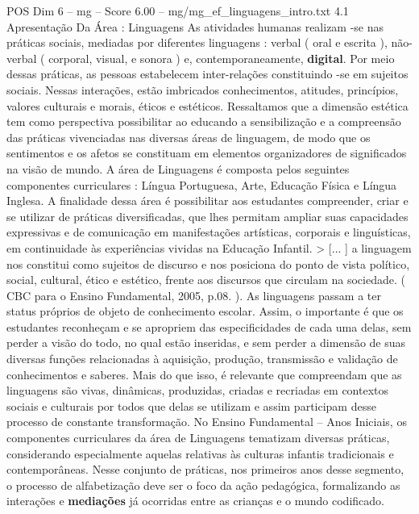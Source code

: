 \begin{textsample}{POS Dim 6 – mg – Score 6.00 – mg/mg\_ef\_linguagens\_intro.txt}  \label{ex:f6_pos_250}
4.1 Apresentação Da Área : Linguagens As atividades humanas realizam -se nas práticas sociais, mediadas por diferentes linguagens : verbal ( oral e escrita ), não-verbal ( corporal, visual, e sonora ) e, contemporaneamente, \textbf{digital}.
Por meio dessas práticas, as pessoas estabelecem inter-relações constituindo -se em sujeitos sociais.
Nessas interações, estão imbricados conhecimentos, atitudes, princípios, valores culturais e morais, éticos e estéticos.
Ressaltamos que a dimensão estética tem como perspectiva possibilitar ao educando a sensibilização e a compreensão das práticas vivenciadas nas diversas áreas de linguagem, de modo que os sentimentos e os afetos se constituam em elementos organizadores de significados na visão de mundo.
A área de Linguagens é composta pelos seguintes componentes curriculares : Língua Portuguesa, Arte, Educação Física e Língua Inglesa.
A finalidade dessa área é possibilitar aos estudantes compreender, criar e se utilizar de práticas diversificadas, que lhes permitam ampliar suas capacidades expressivas e de comunicação em manifestações artísticas, corporais e linguísticas, em continuidade às experiências vividas na Educação Infantil. > [... ] a linguagem nos constitui como sujeitos de discurso e nos posiciona do ponto de vista político, social, cultural, ético e estético, frente aos discursos que circulam na sociedade. ( CBC para o Ensino Fundamental, 2005, p.08. ).
As linguagens passam a ter status próprios de objeto de conhecimento escolar.
Assim, o importante é que os estudantes reconheçam e se apropriem das especificidades de cada uma delas, sem perder a visão do todo, no qual estão inseridas, e sem perder a dimensão de suas diversas funções relacionadas à aquisição, produção, transmissão e validação de conhecimentos e saberes.
Mais do que isso, é relevante que compreendam que as linguagens são vivas, dinâmicas, produzidas, criadas e recriadas em contextos sociais e culturais por todos que delas se utilizam e assim participam desse processo de constante transformação.
No Ensino Fundamental – Anos Iniciais, os componentes curriculares da área de Linguagens tematizam diversas práticas, considerando especialmente aquelas relativas às culturas infantis tradicionais e contemporâneas.
Nesse conjunto de práticas, nos primeiros anos desse segmento, o processo de alfabetização deve ser o foco da ação pedagógica, formalizando as interações e \textbf{mediações} já ocorridas entre as crianças e o mundo codificado.

\end{textsample}
